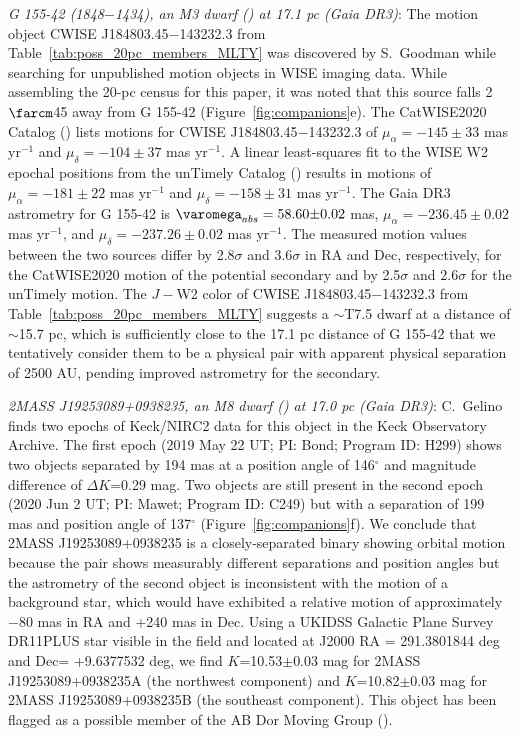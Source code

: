 \documentclass[twocolumn,tighten,twocolappendix]{aastex631}
\begin{document}
{\it G 155-42 (1848$-$1434), an M3 dwarf (\citealt{gaidos2014}) at 17.1 pc (Gaia DR3)}: The motion object CWISE J184803.45$-$143232.3 from Table~\ref{tab:poss_20pc_members_MLTY} was discovered by S.\ Goodman while searching for unpublished motion objects in WISE imaging data. While assembling the 20-pc census for this paper, it was noted that this source falls 2$\farcm$45 away from G 155-42 (Figure~\ref{fig:companions}e). The CatWISE2020 Catalog (\citealt{marocco2021}) lists motions for CWISE J184803.45$-$143232.3 of $\mu_\alpha = -145{\pm}33$ mas yr$^{-1}$ and $\mu_\delta = -104{\pm}37$ mas yr$^{-1}$. A linear least-squares fit to the WISE W2 epochal positions from the unTimely Catalog (\citealt{meisner2022}) results in motions of $\mu_\alpha = -181{\pm}22$ mas yr$^{-1}$ and $\mu_\delta = -158{\pm}31$ mas yr$^{-1}$. The Gaia DR3 astrometry for G 155-42 is $\varomega_{abs} = 58.60{\pm}0.02$ mas, $\mu_\alpha = -236.45{\pm}0.02$ mas yr$^{-1}$, and $\mu_\delta = -237.26{\pm}0.02$ mas yr$^{-1}$. The measured motion values between the two sources differ by 2.8$\sigma$ and 3.6$\sigma$ in RA and Dec, respectively, for the CatWISE2020 motion of the potential secondary and by 2.5$\sigma$ and 2.6$\sigma$ for the unTimely motion. The $J-$W2 color of CWISE J184803.45$-$143232.3 from Table~\ref{tab:poss_20pc_members_MLTY} suggests a $\sim$T7.5 dwarf at a distance of $\sim$15.7 pc, which is sufficiently close to the 17.1 pc distance of G 155-42 that we tentatively consider them to be a physical pair with apparent physical separation of 2500 AU, pending improved astrometry for the secondary.

{\it 2MASS J19253089+0938235, an M8 dwarf (\citealt{west2015}) at 17.0 pc (Gaia DR3)}: C.\ Gelino finds two epochs of Keck/NIRC2 data for this object in the Keck Observatory Archive.  The first epoch (2019 May 22 UT; PI: Bond; Program ID: H299) shows two objects separated by 194 mas at a position angle of 146$^\circ$ and magnitude difference of ${\Delta}K$=0.29 mag.  Two objects are still present in the second epoch (2020 Jun 2 UT; PI: Mawet; Program ID: C249) but with a separation of 199 mas and position angle of 137$^\circ$ (Figure~\ref{fig:companions}f).  We conclude that 2MASS J19253089+0938235 is a closely-separated binary showing orbital motion because the pair shows measurably different separations and position angles but the astrometry of the second object is inconsistent with the motion of a background star, which would have exhibited a relative motion of approximately $-$80 mas in RA and +240 mas in Dec. Using a UKIDSS Galactic Plane Survey DR11PLUS star visible in the field and located at J2000 RA = 291.3801844 deg and Dec= +9.6377532 deg, we find $K$=10.53$\pm$0.03 mag for  2MASS J19253089+0938235A (the northwest component) and $K$=10.82$\pm$0.03 mag for 2MASS J19253089+0938235B (the southeast component). This object has been flagged as a possible member of the AB Dor Moving Group (\citealt{gagne2018b}). 
\end{document}
